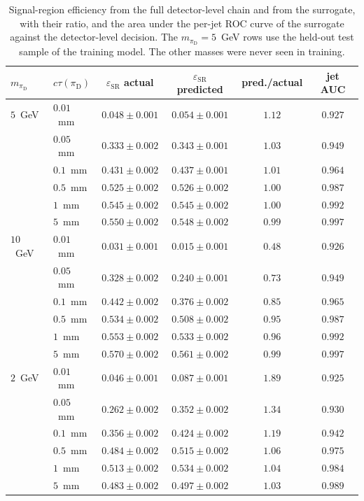 \documentclass[a4paper,11pt]{article}
\newcommand{\ctau}{c\tau}
\newcommand{\pid}{\pi_{\mathrm{D}}}
\newcommand{\mpid}{m_{\pid}}
\newcommand{\effSR}{\varepsilon_{\mathrm{SR}}}
\begin{document}
\begin{table}[htbp]
  \centering
  \begin{tabular}{llcccc}
    \toprule
    $\mpid$ & $\ctau(\pid)$ & $\effSR$ actual & $\effSR$ predicted & pred./actual & jet AUC \\
    \midrule
    $5$~GeV & $0.01$~mm & $0.048 \pm 0.001$ & $0.054 \pm 0.001$ & $1.12$ & $0.927$ \\
     & $0.05$~mm & $0.333 \pm 0.002$ & $0.343 \pm 0.001$ & $1.03$ & $0.949$ \\
     & $0.1$~mm & $0.431 \pm 0.002$ & $0.437 \pm 0.001$ & $1.01$ & $0.964$ \\
     & $0.5$~mm & $0.525 \pm 0.002$ & $0.526 \pm 0.002$ & $1.00$ & $0.987$ \\
     & $1$~mm & $0.545 \pm 0.002$ & $0.545 \pm 0.002$ & $1.00$ & $0.992$ \\
     & $5$~mm & $0.550 \pm 0.002$ & $0.548 \pm 0.002$ & $0.99$ & $0.997$ \\
    $10$~GeV & $0.01$~mm & $0.031 \pm 0.001$ & $0.015 \pm 0.001$ & $0.48$ & $0.926$ \\
     & $0.05$~mm & $0.328 \pm 0.002$ & $0.240 \pm 0.001$ & $0.73$ & $0.949$ \\
     & $0.1$~mm & $0.442 \pm 0.002$ & $0.376 \pm 0.002$ & $0.85$ & $0.965$ \\
     & $0.5$~mm & $0.534 \pm 0.002$ & $0.508 \pm 0.002$ & $0.95$ & $0.987$ \\
     & $1$~mm & $0.553 \pm 0.002$ & $0.533 \pm 0.002$ & $0.96$ & $0.992$ \\
     & $5$~mm & $0.570 \pm 0.002$ & $0.561 \pm 0.002$ & $0.99$ & $0.997$ \\
    $2$~GeV & $0.01$~mm & $0.046 \pm 0.001$ & $0.087 \pm 0.001$ & $1.89$ & $0.925$ \\
     & $0.05$~mm & $0.262 \pm 0.002$ & $0.352 \pm 0.002$ & $1.34$ & $0.930$ \\
     & $0.1$~mm & $0.356 \pm 0.002$ & $0.424 \pm 0.002$ & $1.19$ & $0.942$ \\
     & $0.5$~mm & $0.484 \pm 0.002$ & $0.515 \pm 0.002$ & $1.06$ & $0.975$ \\
     & $1$~mm & $0.513 \pm 0.002$ & $0.534 \pm 0.002$ & $1.04$ & $0.984$ \\
     & $5$~mm & $0.483 \pm 0.002$ & $0.497 \pm 0.002$ & $1.03$ & $0.989$ \\
    \bottomrule
  \end{tabular}
  \caption{Signal-region efficiency from the full detector-level chain
  and from the surrogate, with their ratio, and the area under the
  per-jet ROC curve of the surrogate against the detector-level
  decision. The $\mpid = 5$~GeV rows use the held-out test sample of
  the training model. The other masses were never seen in training.}
  \label{tab:closure}
\end{table}
\end{document}
